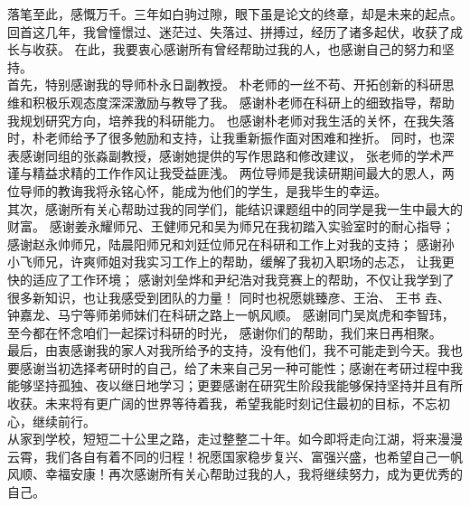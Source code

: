 
\begin{thanks}
落笔至此，感慨万千。三年如白驹过隙，眼下虽是论文的终章，却是未来的起点。
回首这几年，我曾憧憬过、迷茫过、失落过、拼搏过，经历了诸多起伏，收获了成长与收获。
在此，我要衷心感谢所有曾经帮助过我的人，也感谢自己的努力和坚持。
\\
%
%
%
%
\indent
首先，特别感谢我的导师朴永日副教授。
朴老师的一丝不苟、开拓创新的科研思维和积极乐观态度深深激励与教导了我。
感谢朴老师在科研上的细致指导，帮助我规划研究方向，培养我的科研能力。
也感谢朴老师对我生活的关怀，在我失落时，朴老师给予了很多勉励和支持，让我重新振作面对困难和挫折。
同时，也深表感谢同组的张淼副教授，感谢她提供的写作思路和修改建议，
张老师的学术严谨与精益求精的工作作风让我受益匪浅。
两位导师是我读研期间最大的恩人，两位导师的教诲我将永铭心怀，能成为他们的学生，是我毕生的幸运。
\\
%
%
%
%
\indent
其次，感谢所有关心帮助过我的同学们，能结识课题组中的同学是我一生中最大的财富。
感谢姜永耀师兄、王健师兄和吴为师兄在我初踏入实验室时的耐心指导；
感谢赵永帅师兄，陆晨阳师兄和刘廷位师兄在科研和工作上对我的支持；
感谢孙小飞师兄，许爽师姐对我实习工作上的帮助，缓解了我初入职场的忐忑，
让我更快的适应了工作环境；
感谢刘垒烨和尹纪浩对我竞赛上的帮助，不仅让我学到了很多新知识，也让我感受到团队的力量！
同时也祝愿姚臻彦、王治、
王书{ 垚}、
钟嘉龙、马宁等师弟师妹们在科研之路上一帆风顺。
感谢同门吴岚虎和李智玮，至今都在怀念咱们一起探讨科研的时光，
感谢你们的帮助，我们来日再相聚。
\\
%
%
%
%
\indent
最后，由衷感谢我的家人对我所给予的支持，没有他们，我不可能走到今天。我也要感谢当初选择考研时的自己，给了未来自己另一种可能性；感谢在考研过程中我能够坚持孤独、夜以继日地学习；更要感谢在研究生阶段我能够保持坚持并且有所收获。未来将有更广阔的世界等待着我，希望我能时刻记住最初的目标，不忘初心，继续前行。
\\
%
%
%
%
\indent
从家到学校，短短二十公里之路，走过整整二十年。如今即将走向江湖，将来漫漫云霄，我们各自有着不同的归程！祝愿国家稳步复兴、富强兴盛，也希望自己一帆风顺、幸福安康！再次感谢所有关心帮助过我的人，我将继续努力，成为更优秀的自己。
%
\end{thanks}

